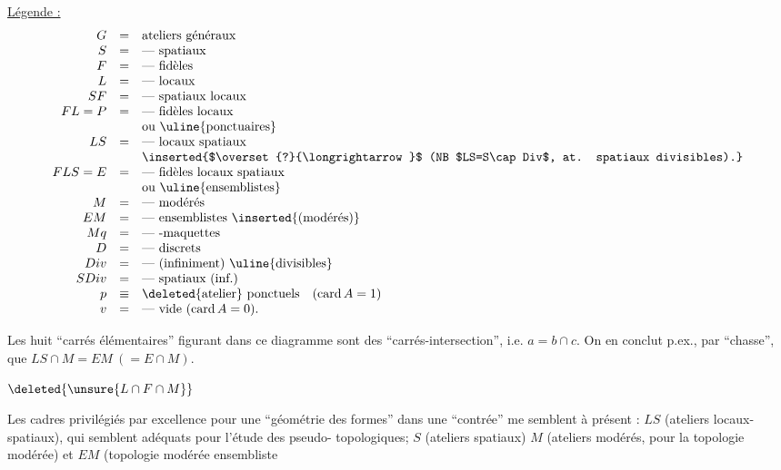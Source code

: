 \uline{Légende :}
\[
\begin{array}{rcll}
G&=&\text{ateliers généraux}\\
S&=&\text{--- spatiaux}\\
F&=&\text{--- fidèles}\\
L&=&\text{--- locaux}\\
SF&=&\text{--- spatiaux locaux}\\
FL=P&=&\text{--- fidèles locaux}\\
&&\text{ou \uline{ponctuaires}}\\
LS&=&\text{--- locaux spatiaux}\\
&&\text{\inserted{$\overset{?}{\longrightarrow}$ (NB $LS=S\cap Div$, at. spatiaux divisibles).}}\\
FLS=E&=&\text{--- fidèles locaux spatiaux}\\
&&\text{ou \uline{ensemblistes}}\\
M&=&\text{--- modérés}\\
EM&=&\text{--- ensemblistes \inserted{(modérés)}}\\
Mq&=&\text{--- -maquettes}\\
D&=&\text{--- discrets}\\
Div&=&\text{--- (infiniment) \uline{divisibles}}\\
SDiv&=&\text{--- spatiaux (inf.)}\\
p&\equiv&\text{\deleted{atelier} ponctuels}\quad(\operatorname{card}A=1)\\
v&=&\text{--- vide}\ (\operatorname{card}A=0).
\end{array}
\]

Les huit ``carrés élémentaires'' figurant dans ce diagramme sont des ``carrés-intersection'', i.e. $a=b\cap c$. On en conclut p.ex., par ``chasse'', que $LS\cap M=EM\ (=E\cap M)$.

$\deleted{\unsure{L\cap F\cap M}}$

Les cadres privilégiés par excellence pour une ``géométrie des formes'' dans une ``contrée'' me semblent à présent : $LS$  (ateliers locaux-spatiaux),   qui semblent adéquats pour l'étude des   pseudo- topologiques; $S$ (ateliers spatiaux)  $M$ (ateliers modérés, pour la topologie modérée) et $EM$ (topologie modérée ensembliste\unsure{)}

